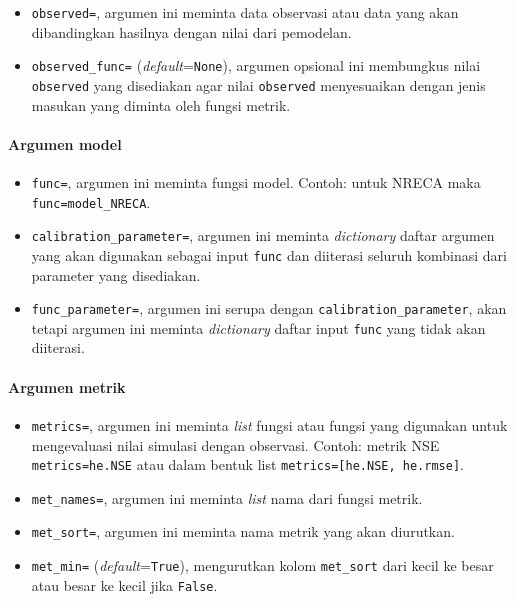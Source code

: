 \documentclass[11pt]{article}
\providecommand{\tightlist}{%
      \setlength{\itemsep}{0pt}\setlength{\parskip}{0pt}}
\begin{document}
\begin{itemize}
\tightlist
\item
  \texttt{observed=}, argumen ini meminta data observasi atau data yang
  akan dibandingkan hasilnya dengan nilai dari pemodelan.
\item
  \texttt{observed\_func=} (\emph{default}=\texttt{None}), argumen
  opsional ini membungkus nilai \texttt{observed} yang disediakan agar
  nilai \texttt{observed} menyesuaikan dengan jenis masukan yang diminta
  oleh fungsi metrik.
\end{itemize}

\hypertarget{argumen-model}{%
\paragraph{Argumen model}\label{argumen-model}}

\begin{itemize}
\tightlist
\item
  \texttt{func=}, argumen ini meminta fungsi model. Contoh: untuk NRECA
  maka \texttt{func=model\_NRECA}.
\item
  \texttt{calibration\_parameter=}, argumen ini meminta
  \emph{dictionary} daftar argumen yang akan digunakan sebagai input
  \texttt{func} dan diiterasi seluruh kombinasi dari parameter yang
  disediakan.
\item
  \texttt{func\_parameter=}, argumen ini serupa dengan
  \texttt{calibration\_parameter}, akan tetapi argumen ini meminta
  \emph{dictionary} daftar input \texttt{func} yang tidak akan
  diiterasi.
\end{itemize}

\hypertarget{argumen-metrik}{%
\paragraph{Argumen metrik}\label{argumen-metrik}}

\begin{itemize}
\tightlist
\item
  \texttt{metrics=}, argumen ini meminta \emph{list} fungsi atau fungsi
  yang digunakan untuk mengevaluasi nilai simulasi dengan observasi.
  Contoh: metrik NSE \texttt{metrics=he.NSE} atau dalam bentuk list
  \texttt{metrics={[}he.NSE,\ he.rmse{]}}.
\item
  \texttt{met\_names=}, argumen ini meminta \emph{list} nama dari fungsi
  metrik.
\item
  \texttt{met\_sort=}, argumen ini meminta nama metrik yang akan
  diurutkan.
\item
  \texttt{met\_min=} (\emph{default}=\texttt{True}), mengurutkan kolom
  \texttt{met\_sort} dari kecil ke besar atau besar ke kecil jika
  \texttt{False}.
\end{itemize}
\end{document}
